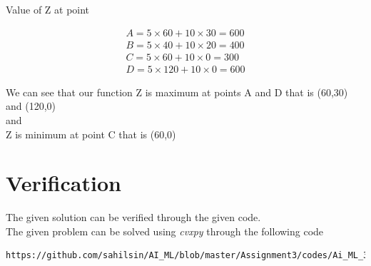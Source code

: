 Value of Z at point

\begin{align*}
     A= 5\times 60 + 10 \times 30 =600
\\
     B= 5\times 40 + 10 \times 20 =400
\\
     C= 5\times 60 + 10 \times 0 =300
\\
     D= 5\times 120 + 10 \times 0 =600
\end{align*}

We can see that our function Z is maximum at points A and D that is (60,30) and (120,0)\\
and\\
Z is minimum at point C that is (60,0)\\
%
\section{Verification}
The given solution can be verified through the given code.\\
The given problem can be solved using {\em cvxpy} through the following code
\begin{lstlisting}
https://github.com/sahilsin/AI_ML/blob/master/Assignment3/codes/Ai_ML_3.py
\end{lstlisting}
